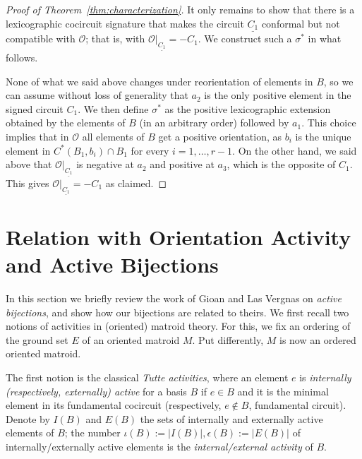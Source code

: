 \documentclass[12pt]{amsart}
\numberwithin{equation}{section}
\theoremstyle{definition}
\newcommand{\Ocal}{{\mathcal O}}
\newcommand{\paco}[1]{\todo[color=orange!30]{\footnotesize \rm #1 \\ \hfill --- P.}}
\begin{document}
\begin{proof}[Proof of Theorem~\ref{thm:characterization}]
It only remains to show that there is a lexicographic cocircuit signature that makes the circuit $\underline{C_1}$ conformal but not compatible with $\Ocal$; that is, with $\Ocal|_{\underline{C_1}}=-C_1$.
We construct such a $\sigma^*$ in what follows. 

None of what we said above changes under reorientation of elements in $B$, so we can assume without loss of generality that $a_2$ is the only positive element in the signed circuit $C_1$.
We then define $\sigma^*$ as the positive lexicographic extension obtained by the elements of $B$ (in an arbitrary order) followed by $a_1$. 
This choice implies that in $\Ocal$ all elements of $B$ get a positive orientation, as $b_i$ is the unique element in $C^*(B_1,b_i)\cap B_1$ for every $i=1,\ldots, r-1$. On the other hand, we said above that $\Ocal|_{\underline{C_1}}$ is negative at $a_2$ and positive at $a_3$, which is the opposite of $C_1$.
This gives $\Ocal|_{\underline{C_1}}=-C_1$ as claimed.
\end{proof}


\section{Relation with Orientation Activity and Active Bijections} 
\label{sec:activity}


In this section we briefly review the work of Gioan and Las Vergnas on {\em active bijections}, and show how our bijections are related to theirs. We first recall two  notions of activities in (oriented) matroid theory.
For this, we fix an ordering of the ground set $E$ of an oriented matroid $M$. Put differently, $M$ is now an ordered oriented matroid.

\medskip


The first notion is the classical {\em Tutte activities}, where an element $e$ is {\em internally (respectively, externally) active} for a basis $B$ if $e\in B$ and it is the minimal element in its fundamental cocircuit (respectively, $e\not\in B$, fundamental circuit).
Denote by $I(B)$ and $E(B)$ the sets of internally and externally active elements of $B$; 
the number $\iota(B):=|I(B)|,\epsilon(B):=|E(B)|$ of internally/externally active elements is the {\em internal/external activity} of $B$.
\end{document}
